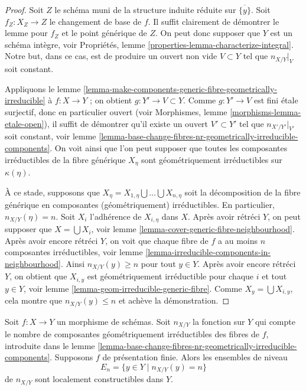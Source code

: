 \begin{proof}
Soit $Z$ le schéma muni de la structure induite réduite sur $\overline{\{y\}}$.
Soit $f_Z : X_Z \to Z$ le changement de base de $f$. Il suffit clairement de démontrer
le lemme pour $f_Z$ et le point générique de $Z$. On peut donc supposer que
$Y$ est un schéma intègre, voir
Propriétés, lemme \ref{properties-lemma-characterize-integral}.
Notre but, dans ce cas, est de produire un ouvert non vide $V \subset Y$ tel que
$n_{X/Y}|_V$ soit constant.

\medskip\noindent
Appliquons le
lemme \ref{lemma-make-components-generic-fibre-geometrically-irreducible}
à $f : X \to Y$ ; on obtient $g : Y' \to V \subset Y$. Comme $g : Y' \to V$ est
fini étale surjectif, donc en particulier ouvert (voir
Morphismes, lemme \ref{morphisms-lemma-etale-open}),
il suffit de démontrer qu'il existe un ouvert $V' \subset Y'$
tel que $n_{X'/Y'}|_{V'}$ soit constant, voir
lemme \ref{lemma-base-change-fibres-nr-geometrically-irreducible-components}.
On voit ainsi que l'on peut supposer que toutes les composantes irréductibles de
la fibre générique $X_\eta$ sont géométriquement irréductibles sur $\kappa(\eta)$.

\medskip\noindent
À ce stade, supposons que
$X_\eta = X_{1, \eta} \bigcup \ldots \bigcup X_{n, \eta}$
soit la décomposition de la fibre générique en composantes
(géométriquement) irréductibles.
En particulier, $n_{X/Y}(\eta) = n$.
Soit $X_i$ l'adhérence de
$X_{i, \eta}$ dans $X$. Après avoir rétréci $Y$, on peut supposer que
$X = \bigcup X_i$, voir
lemme \ref{lemma-cover-generic-fibre-neighbourhood}.
Après avoir encore rétréci $Y$, on voit que chaque fibre de
$f$ a au moins $n$ composantes irréductibles, voir
lemme \ref{lemma-irreducible-components-in-neighbourhood}.
Ainsi $n_{X/Y}(y) \geq n$ pour tout $y \in Y$.
Après avoir encore rétréci $Y$, on obtient que $X_{i, y}$
est géométriquement irréductible pour chaque $i$ et tout $y \in Y$, voir
lemme \ref{lemma-geom-irreducible-generic-fibre}.
Comme $X_y = \bigcup X_{i, y}$,
cela montre que $n_{X/Y}(y) \leq n$ et achève la démonstration.
\end{proof}

\begin{lemma}
\label{lemma-nr-geom-irreducible-components-constructible}
Soit $f : X \to Y$ un morphisme de schémas. Soit
$n_{X/Y}$ la fonction sur $Y$ qui compte le nombre de composantes
géométriquement irréductibles des fibres de $f$, introduite dans le
lemme \ref{lemma-base-change-fibres-nr-geometrically-irreducible-components}.
Supposons $f$ de présentation finie. Alors les ensembles de niveau
$$
E_n = \{y \in Y \mid n_{X/Y}(y) = n\}
$$
de $n_{X/Y}$ sont localement constructibles dans $Y$.
\end{lemma}

